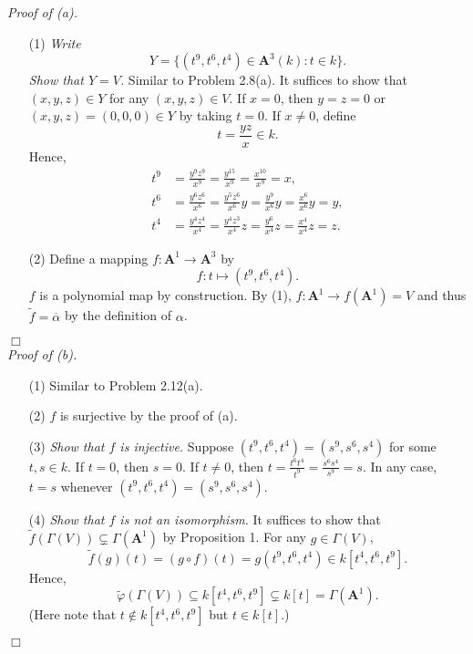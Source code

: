 \documentclass{article}
\begin{document}
\emph{Proof of (a).}
\begin{enumerate}
\item[(1)]
  \emph{Write
  \[
    Y = \{ (t^9, t^6, t^4) \in \mathbf{A}^3(k) : t \in k \}.
  \]
  Show that $Y = V$.}
  Similar to Problem 2.8(a).
  It suffices to show that $(x,y,z) \in Y$ for any $(x,y,z) \in V$.
  If $x = 0$, then $y = z = 0$ or $(x,y,z) = (0,0,0) \in Y$ by taking $t = 0$.
  If $x \neq 0$, define
  \[
    t = \frac{yz}{x} \in k.
  \]
  Hence,
  \begin{align*}
    t^9 &= \frac{y^9 z^9}{x^9} = \frac{y^{15}}{x^9} = \frac{x^{10}}{x^9} = x, \\
    t^6
    &= \frac{y^6 z^6}{x^6} = \frac{y^5 z^6}{x^6} y = \frac{y^9}{x^6} y = \frac{x^6}{x^6} y = y, \\
    t^4
    &= \frac{y^4 z^4}{x^4} = \frac{y^4 z^3}{x^4} z = \frac{y^6}{x^4} z = \frac{x^4}{x^4} z = z.
  \end{align*}

\item[(2)]
  Define a mapping $f: \mathbf{A}^1 \to \mathbf{A}^3$ by
  \[
    f: t \mapsto (t^9, t^6, t^4).
  \]
  $f$ is a polynomial map by construction.
  By (1), $f: \mathbf{A}^1 \to f(\mathbf{A}^1) = V$
  and thus $\widetilde{f}=\overline{\alpha}$ by the definition of $\alpha$.
\end{enumerate}
$\Box$ \\



\emph{Proof of (b).}
\begin{enumerate}
\item[(1)]
  Similar to Problem 2.12(a).

\item[(2)]
  $f$ is surjective by the proof of (a).

\item[(3)]
  \emph{Show that $f$ is injective.}
  Suppose $(t^9, t^6, t^4) = (s^9, s^6, s^4)$ for some $t, s \in k$.
  If $t = 0$, then $s = 0$.
  If $t \neq 0$, then $t = \frac{t^6 t^4}{t^9} = \frac{s^6 s^4}{s^9} = s$.
  In any case, $t = s$ whenever $(t^9, t^6, t^4) = (s^9, s^6, s^4)$.

\item[(4)]
  \emph{Show that $f$ is not an isomorphism.}
  It suffices to show that $\widetilde{f}(\Gamma(V)) \subsetneq \Gamma(\mathbf{A}^{1})$
  by Proposition 1.
  For any $g \in \Gamma(V)$,
  \[
    \widetilde{f}(g)(t) = (g \circ f)(t) = g(t^9,t^6,t^4) \in k[t^4,t^6,t^9].
  \]
  Hence,
  \[
    \widetilde{\varphi}(\Gamma(V)) \subseteq k[t^4,t^6,t^9] \subsetneq k[t] = \Gamma(\mathbf{A}^{1}).
  \]
  (Here note that $t \not\in k[t^4,t^6,t^9]$ but $t \in k[t]$.)
\end{enumerate}
$\Box$ \\\\
\end{document}
